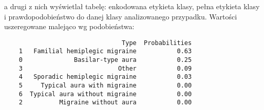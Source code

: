 a drugi z nich wyświetlał tabelę: enkodowana etykieta klasy, pełna etykieta klasy i prawdopodobieństwo do danej klasy analizowanego przypadku. Wartości uszeregowane malejąco wg podobieństwa:

\begin{verbatim}
                                Type  Probabilities
    1   Familial hemiplegic migraine           0.63
    0              Basilar-type aura           0.25
    3                          Other           0.09
    4   Sporadic hemiplegic migraine           0.03
    5     Typical aura with migraine           0.00
    6  Typical aura without migraine           0.00
    2          Migraine without aura           0.00
\end{verbatim}